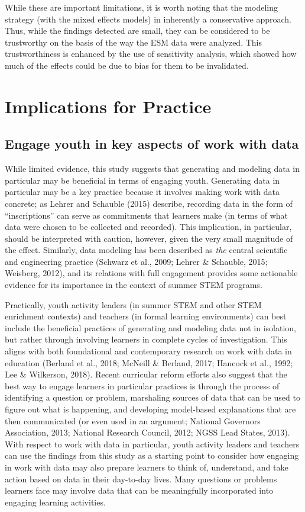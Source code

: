 \documentclass[]{book}
\theoremstyle{definition}
\theoremstyle{definition}
\theoremstyle{definition}
\theoremstyle{remark}
\begin{document}
While these are important limitations, it is worth noting that the
modeling strategy (with the mixed effects models) in inherently a
conservative approach. Thus, while the findings detected are small, they
can be considered to be trustworthy on the basis of the way the ESM data
were analyzed. This trustworthiness is enhanced by the use of
sensitivity analysis, which showed how much of the effects could be due
to bias for them to be invalidated.

\section{Implications for Practice}\label{implications-for-practice}

\subsection{Engage youth in key aspects of work with
data}\label{engage-youth-in-key-aspects-of-work-with-data}

While limited evidence, this study suggests that generating and modeling
data in particular may be beneficial in terms of engaging youth.
Generating data in particular may be a key practice because it involves
making work with data concrete; as Lehrer and Schauble (2015) describe,
recording data in the form of ``inscriptions'' can serve as commitments
that learners make (in terms of what data were chosen to be collected
and recorded). This implication, in particular, should be interpreted
with caution, however, given the very small magnitude of the effect.
Similarly, data modeling has been described as \emph{the} central
scientific and engineering practice (Schwarz et al., 2009; Lehrer \&
Schauble, 2015; Weisberg, 2012), and its relations with full engagement
provides some actionable evidence for its importance in the context of
summer STEM programs.

Practically, youth activity leaders (in summer STEM and other STEM
enrichment contexts) and teachers (in formal learning environments) can
best include the beneficial practices of generating and modeling data
not in isolation, but rather through involving learners in complete
cycles of investigation. This aligns with both foundational and
contemporary research on work with data in education (Berland et al.,
2018; McNeill \& Berland, 2017; Hancock et al., 1992; Lee \& Wilkerson,
2018). Recent curricular reform efforts also suggest that the best way
to engage learners in particular practices is through the process of
identifying a question or problem, marshaling sources of data that can
be used to figure out what is happening, and developing model-based
explanations that are then communicated (or even used in an argument;
National Governors Association, 2013; National Research Council, 2012;
NGSS Lead States, 2013). With respect to work with data in particular,
youth activity leaders and teachers can use the findings from this study
as a starting point to consider how engaging in work with data may also
prepare learners to think of, understand, and take action based on data
in their day-to-day lives. Many questions or problems learners face may
involve data that can be meaningfully incorporated into engaging
learning activities.
\end{document}
